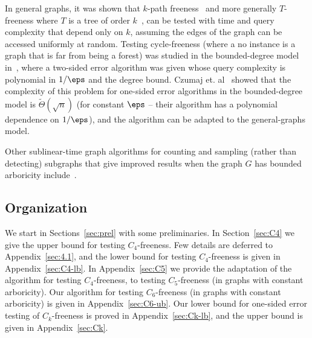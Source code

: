 In general graphs, it was shown that $k$-path freeness~\cite{IY18} and more generally $T$-freeness where $T$ is a tree of order $k$~\cite{EFFGLMMOORT17}, can be tested with time and query complexity that depend only on $k$, assuming the edges of the graph can be accessed uniformly at random.
Testing cycle-freeness (where a no instance is a graph that is far from being a forest) was studied in the bounded-degree model in~\cite{GR-bound}, where a two-sided error algorithm was given whose query complexity is polynomial in $1/\eps$ and the degree bound. Czumaj  et. al~\cite{CGRSSS14} showed that the complexity of this problem for one-sided error algorithms in the bounded-degree model is $\widetilde{\Theta}(\sqrt{n})$ (for constant $\eps$ -- their algorithm has a polynomial dependence on $1/\eps$), and the algorithm can be adapted to the general-graphs model.

Other sublinear-time graph algorithms 
for counting and sampling (rather than detecting) subgraphs 
that give improved results when the graph $G$ has bounded arboricity include~\cite{ERS19,ERR19,ERS20, ERR22}. 

\subsection{Organization}
We start in Sections~\ref{sec:prel} with some preliminaries. In 
Section~\ref{sec:C4} we give the upper bound for testing $C_4$-freeness. Few details are deferred to Appendix~\ref{sec:4.1}, and the lower bound for testing $C_4$-freeness is given in 
Appendix~\ref{sec:C4-lb}.
In Appendix~\ref{sec:C5} we provide the adaptation of the algorithm for testing $C_4$-freeness, to testing $C_5$-freeness (in graphs with constant arboricity). 
Our algorithm for testing $C_6$-freeness (in graphs with constant arboricity) is given in Appendix~\ref{sec:C6-ub}. Our lower bound for one-sided error testing of $C_k$-freeness is proved in Appendix~\ref{sec:Ck-lb}, and the upper bound is given in Appendix~\ref{sec:Ck}.


